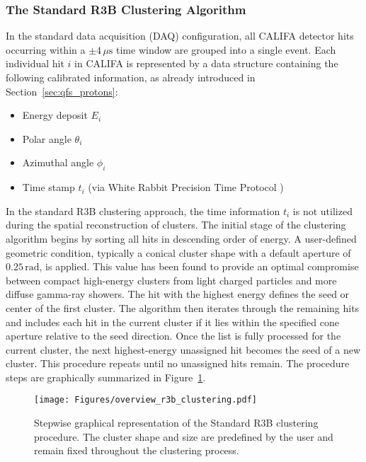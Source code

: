 \subsubsection{The Standard R3B Clustering Algorithm}
In the standard data acquisition (DAQ) configuration, all CALIFA detector hits occurring within a $\pm 4\,\mu\mathrm{s}$ time window are grouped into a single event. Each individual hit $i$ in CALIFA is represented by a data structure containing the following calibrated information, as already introduced in Section~\ref{sec:qfs_protons}:
\begin{itemize}
    \item Energy deposit $E_i$
    \item Polar angle $\theta_i$
    \item Azimuthal angle $\phi_i$
    \item Time stamp $t_i$ (via White Rabbit  Precision Time Protocol \cite{lipinski2011white})
\end{itemize}
In the standard R3B clustering approach, the time information $t_i$ is not utilized during the spatial reconstruction of clusters.\newline
The initial stage of the clustering algorithm begins by sorting all hits in descending order of energy. A user-defined geometric condition, typically a conical cluster shape with a default aperture of $0.25\,\mathrm{rad}$, is applied. This value has been found to provide an optimal compromise between compact high-energy clusters from light charged particles and more diffuse gamma-ray showers.\newline
The hit with the highest energy defines the seed or center of the first cluster. The algorithm then iterates through the remaining hits and includes each hit in the current cluster if it lies within the specified cone aperture relative to the seed direction. Once the list is fully processed for the current cluster, the next highest-energy unassigned hit becomes the seed of a new cluster. This procedure repeats until no unassigned hits remain. The procedure steps are graphically summarized in Figure~\ref{fig:r3b_standard_clustering}.
\begin{figure}[!htb]
       \centering
       \texttt{[image: Figures/overview\_r3b\_clustering.pdf]}
       \caption{Stepwise graphical representation of the Standard R3B clustering procedure. The cluster shape and size are predefined by the user and remain fixed throughout the clustering process.}
       \label{fig:r3b_standard_clustering}%
\end{figure}


